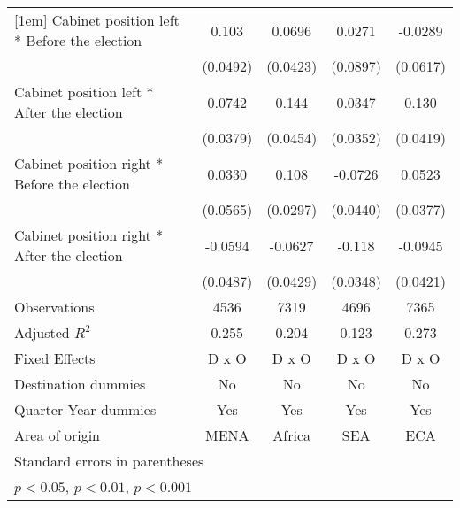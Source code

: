 \begin{table}[htbp]
\begin{tabular}{l*{4}{c}}
[1em]
Cabinet position left * Before the election&       0.103         &      0.0696         &      0.0271         &     -0.0289         \\
                    &    (0.0492)         &    (0.0423)         &    (0.0897)         &    (0.0617)         \\
[1em]
Cabinet position left * After the election&      0.0742         &       0.144\sym{**} &      0.0347         &       0.130\sym{**} \\
                    &    (0.0379)         &    (0.0454)         &    (0.0352)         &    (0.0419)         \\
[1em]
Cabinet position right * Before the election&      0.0330         &       0.108\sym{**} &     -0.0726         &      0.0523         \\
                    &    (0.0565)         &    (0.0297)         &    (0.0440)         &    (0.0377)         \\
[1em]
Cabinet position right * After the election&     -0.0594         &     -0.0627         &      -0.118\sym{**} &     -0.0945\sym{*}  \\
                    &    (0.0487)         &    (0.0429)         &    (0.0348)         &    (0.0421)         \\
\hline
Observations        &        4536         &        7319         &        4696         &        7365         \\
Adjusted \(R^{2}\)  &       0.255         &       0.204         &       0.123         &       0.273         \\
Fixed Effects       &       D x O         &       D x O         &       D x O         &       D x O         \\
Destination dummies &          No         &          No         &          No         &          No         \\
Quarter-Year dummies&         Yes         &         Yes         &         Yes         &         Yes         \\
Area of origin      &        MENA         &      Africa         &         SEA         &         ECA         \\
\hline\hline
\multicolumn{5}{l}{\footnotesize Standard errors in parentheses}\\
\multicolumn{5}{l}{\footnotesize \sym{*} \(p<0.05\), \sym{**} \(p<0.01\), \sym{***} \(p<0.001\)}\\
\end{tabular}
\end{table}
